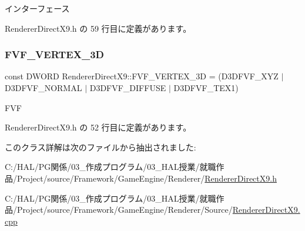インターフェース 



 Renderer\+Direct\+X9.\+h の 59 行目に定義があります。

\mbox{\label{class_renderer_direct_x9_a80ce0089b01354986332553353625da6}} 
\subsubsection{\texorpdfstring{F\+V\+F\+\_\+\+V\+E\+R\+T\+E\+X\+\_\+3D}{FVF\_VERTEX\_3D}}
{\footnotesize\ttfamily const D\+W\+O\+RD Renderer\+Direct\+X9\+::\+F\+V\+F\+\_\+\+V\+E\+R\+T\+E\+X\+\_\+3D = (D3\+D\+F\+V\+F\+\_\+\+X\+YZ $\vert$ D3\+D\+F\+V\+F\+\_\+\+N\+O\+R\+M\+AL $\vert$ D3\+D\+F\+V\+F\+\_\+\+D\+I\+F\+F\+U\+SE $\vert$ D3\+D\+F\+V\+F\+\_\+\+T\+E\+X1)\hspace{0.3cm}{\ttfamily [static]}}



F\+VF 



 Renderer\+Direct\+X9.\+h の 52 行目に定義があります。



このクラス詳解は次のファイルから抽出されました\+:\begin{DoxyCompactItemize}
\item 
C\+:/\+H\+A\+L/\+P\+G関係/03\+\_\+作成プログラム/03\+\_\+\+H\+A\+L授業/就職作品/\+Project/source/\+Framework/\+Game\+Engine/\+Renderer/\mbox{\hyperlink{_renderer_direct_x9_8h}{Renderer\+Direct\+X9.\+h}}\item 
C\+:/\+H\+A\+L/\+P\+G関係/03\+\_\+作成プログラム/03\+\_\+\+H\+A\+L授業/就職作品/\+Project/source/\+Framework/\+Game\+Engine/\+Renderer/\+Source/\mbox{\hyperlink{_renderer_direct_x9_8cpp}{Renderer\+Direct\+X9.\+cpp}}\end{DoxyCompactItemize}
